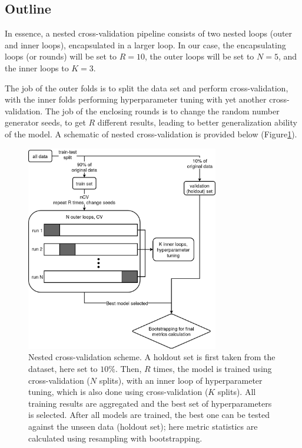 \documentclass[12pt]{article}
\begin{document}
\subsection{Outline}

In essence, a nested cross-validation pipeline consists of two nested loops
(outer and inner loops), encapsulated in a larger loop. In our case, the
encapsulating loops (or rounds) will be set to $R=10$, the outer loops will be
set to $N=5$, and the inner loops to $K=3$.

The job of the outer folds is to split the data set and perform
cross-validation, with the inner folds performing hyperparameter tuning with
yet another cross-validation. The job of the enclosing rounds is to change the
random number generator seeds, to get $R$ different results, leading to better
generalization ability of the model. A schematic of nested cross-validation is
provided below (Figure\ref{fig:ncv_scheme}).

\begin{figure}[H]
    \centering
    \includegraphics[width=0.75\textwidth]{ims/nCV.drawio.png}
    \caption{Nested cross-validation scheme. A holdout set is first taken from
    the dataset, here set to $10\%$. Then, $R$ times, the model is trained
    using cross-validation ($N$ splits), with an inner loop of hyperparameter
    tuning, which is also done using cross-validation ($K$ splits). All
    training results are aggregated and the best set of hyperparameters
    is selected. After all models are trained, the best one can be tested
    against the unseen data (holdout set); here metric statistics are
    calculated using resampling with bootstrapping.}
    \label{fig:ncv_scheme}
\end{figure}
\end{document}
